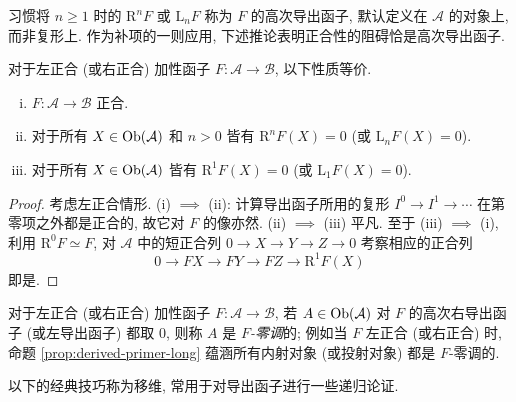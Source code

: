 习惯将 $n \geq 1$ 时的 $\mathrm{R}^n F$ 或 $\mathrm{L}_n F$ 称为 $F$ 的高次导出函子, 默认定义在 $\mathcal{A}$ 的对象上, 而非复形上. 作为补项的一则应用, 下述推论表明正合性的阻碍恰是高次导出函子.

\begin{corollary}\label{prop:obstruction-exactness}
	对于左正合 (或右正合) 加性函子 $F: \mathcal{A} \to \mathcal{B}$, 以下性质等价.
	\begin{enumerate}[(i)]
		\item $F: \mathcal{A} \to \mathcal{B}$ 正合.
		\item 对于所有 $X \in \operatorname{Ob}(\mathcal{A})$ 和 $n > 0$ 皆有 $\mathrm{R}^n F(X) = 0$ (或 $\mathrm{L}_n F(X) = 0$).
		\item 对于所有 $X \in \operatorname{Ob}(\mathcal{A})$ 皆有 $\mathrm{R}^1 F(X) = 0$ (或 $\mathrm{L}_1 F(X) = 0$).
	\end{enumerate}
\end{corollary}
\begin{proof}
	考虑左正合情形. (i) $\implies$ (ii): 计算导出函子所用的复形 $I^0 \to I^1 \to \cdots$ 在第零项之外都是正合的, 故它对 $F$ 的像亦然. (ii) $\implies$ (iii) 平凡. 至于 (iii) $\implies$ (i), 利用 $\mathrm{R}^0 F \simeq F$, 对 $\mathcal{A}$ 中的短正合列 $0 \to X \to Y \to Z \to 0$ 考察相应的正合列
	\[ 0 \to FX \to FY \to FZ \to \mathrm{R}^1 F(X) \]
	即是.
\end{proof}

\begin{convention}\label{con:F-acyclic}
	对于左正合 (或右正合) 加性函子 $F: \mathcal{A} \to \mathcal{B}$, 若 $A \in \operatorname{Ob}(\mathcal{A})$ 对 $F$ 的高次右导出函子 (或左导出函子) 都取 $0$, 则称 $A$ 是 \emph{$F$-零调}的; 例如当 $F$ 左正合 (或右正合) 时, 命题 \ref{prop:derived-primer-long} 蕴涵所有内射对象 (或投射对象) 都是 $F$-零调的.
\end{convention}

以下的经典技巧称为移维, 常用于对导出函子进行一些递归论证.

